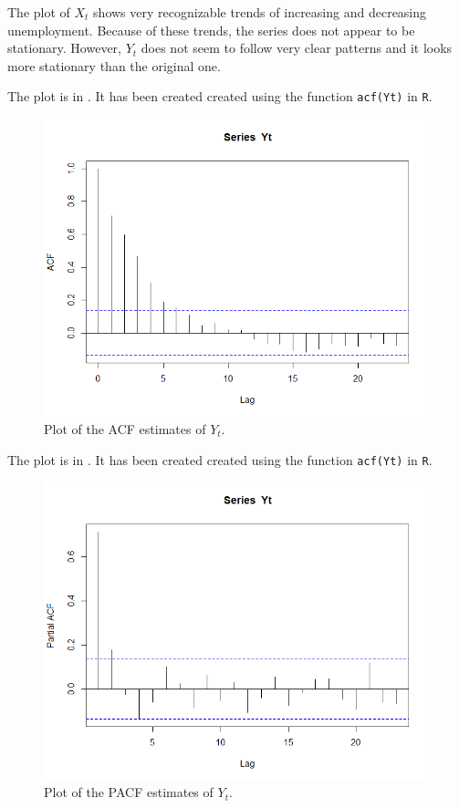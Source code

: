 \documentclass{article}
\theoremstyle{plain}
\theoremstyle{definition}
\newenvironment{exercise}[1]
  {\renewcommand\theexerciseaux{#1}\exerciseaux\label{ejer:#1}}
  {\endexerciseaux}
\newenvironment{sol}{\begin{trivlist}
 \item[\hskip \labelsep {\textit{Solution}.}\hskip \labelsep]}{\end{trivlist}}
\begin{document}
\begin{exercise}{3}
\end{exercise}
\begin{sol}
The plot of $X_t$ shows very recognizable trends of increasing and decreasing unemployment. Because of these trends, the series does not appear to be stationary. However, $Y_t$ does not seem to follow very clear patterns and it looks more stationary than the original one.
\end{sol}
\begin{exercise}{4}
\end{exercise}
\begin{sol}
The plot is in . It has been created created using the function \texttt{acf(Yt)} in \texttt{R}.
\begin{figure}
\centering
\includegraphics[scale=0.5]{acf}
\caption{Plot of the ACF estimates of $Y_t$.}\label{acf}
\end{figure}
\end{sol}
\begin{exercise}{5}
The plot is in . It has been created created using the function \texttt{acf(Yt)} in \texttt{R}.
\begin{figure}
\centering
\includegraphics[scale=0.5]{pacf}
\caption{Plot of the PACF estimates of $Y_t$.}\label{pacf}
\end{figure}
\end{exercise}
\end{document}
